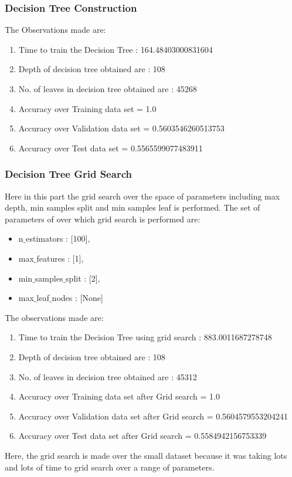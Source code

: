 \documentclass[11pt]{article}
\begin{document}
\subsubsection{Decision Tree Construction}
The Observations made are:
\begin{enumerate}
\item Time to train the Decision Tree : 164.48403000831604
\item Depth of decision tree obtained are : 108
\item No. of leaves in decision tree obtained are : 45268
\item Accuracy over Training data set = 1.0
\item Accuracy over Validation data set = 0.5603546260513753
\item Accuracy over Test data set = 0.5565599077483911
\end{enumerate}
\subsubsection{Decision Tree Grid Search}
Here in this part the grid search over the space of parameters
including max depth, min samples split and min samples leaf is performed. The set of parameters of over which grid search is performed are:
\begin{itemize}
\item n$\_$estimators : [100],  
\item max$\_$features : [1], 
\item min$\_$samples$\_$split : [2],
\item max$\_$leaf$\_$nodes : [None]
\end{itemize}
\hline
\vspace{3mm}
The observations made are:
\begin{enumerate}
\item Time to train the Decision Tree using grid search : 883.0011687278748
\item Depth of decision tree obtained are : 108
\item No. of leaves in decision tree obtained are : 45312
\item Accuracy over Training data set after Grid search = 1.0
\item Accuracy over Validation data set after Grid search = 0.5604579553204241
\item Accuracy over Test data set after Grid search = 0.5584942156753339
\end{enumerate}
Here, the grid search is made over the small dataset because it was taking lots and lots of time to grid search over a range of parameters.
\end{document}
